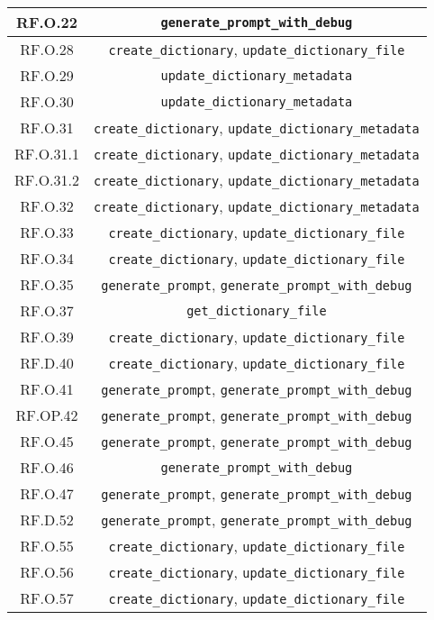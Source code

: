 \begin{adjustwidth}{-0.5cm}{-0.5cm}
\begin{longtable}{|c|c|}
    \hline RF.O.22 & \texttt{generate\_prompt\_with\_debug} \\
    \hline RF.O.28 & \texttt{create\_dictionary}, \texttt{update\_dictionary\_file} \\
    \hline RF.O.29 & \texttt{update\_dictionary\_metadata} \\
    \hline RF.O.30 & \texttt{update\_dictionary\_metadata} \\
    \hline RF.O.31 & \texttt{create\_dictionary}, \texttt{update\_dictionary\_metadata} \\
    \hline RF.O.31.1 & \texttt{create\_dictionary}, \texttt{update\_dictionary\_metadata} \\
    \hline RF.O.31.2 & \texttt{create\_dictionary}, \texttt{update\_dictionary\_metadata} \\
    \hline RF.O.32 & \texttt{create\_dictionary}, \texttt{update\_dictionary\_metadata} \\
    \hline RF.O.33 & \texttt{create\_dictionary}, \texttt{update\_dictionary\_file} \\
    \hline RF.O.34 & \texttt{create\_dictionary}, \texttt{update\_dictionary\_file} \\
    \hline RF.O.35 & \texttt{generate\_prompt}, \texttt{generate\_prompt\_with\_debug} \\
    \hline RF.O.37 & \texttt{get\_dictionary\_file} \\
    \hline RF.O.39 & \texttt{create\_dictionary}, \texttt{update\_dictionary\_file} \\
    \hline RF.D.40 & \texttt{create\_dictionary}, \texttt{update\_dictionary\_file} \\
    \hline RF.O.41 & \texttt{generate\_prompt}, \texttt{generate\_prompt\_with\_debug} \\
    \hline RF.OP.42 & \texttt{generate\_prompt}, \texttt{generate\_prompt\_with\_debug} \\
    \hline RF.O.45 & \texttt{generate\_prompt}, \texttt{generate\_prompt\_with\_debug} \\
    \hline RF.O.46 & \texttt{generate\_prompt\_with\_debug} \\
    \hline RF.O.47 & \texttt{generate\_prompt}, \texttt{generate\_prompt\_with\_debug} \\
    \hline RF.D.52 & \texttt{generate\_prompt}, \texttt{generate\_prompt\_with\_debug} \\
    \hline RF.O.55 & \texttt{create\_dictionary}, \texttt{update\_dictionary\_file} \\
    \hline RF.O.56 & \texttt{create\_dictionary}, \texttt{update\_dictionary\_file} \\
    \hline RF.O.57 & \texttt{create\_dictionary}, \texttt{update\_dictionary\_file} \\
  \end{longtable}
\end{adjustwidth}
\egroup